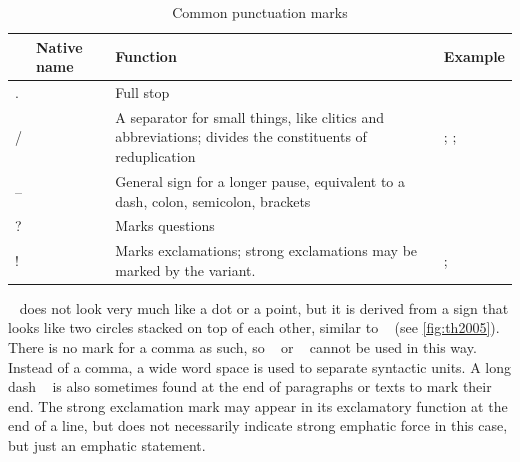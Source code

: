 \begin{table}[tp]
\caption{Common punctuation marks}
\begin{tabu} to 
\toprule
\tableheaderfont

	& Native name
	& Function
	& Example
	\\
	
\toprule

.
	& 
	& Full stop
	& 
	\\
	
\midrule

/
	& 
	& A separator for small things, like clitics and abbreviations; 
		divides the constituents of reduplication
	& ; %
		; %
	\\
	
\midrule

–
	& 
	& General sign for a longer pause, equivalent to a dash, 
		colon, semicolon, brackets 
	& 
	\\

\midrule

?
	& 
	& Marks questions
	& 
	\\

\midrule

!
	& 
	& Marks exclamations; strong exclamations may be marked by the  
		variant.
	& ; %
	\\

\bottomrule
\end{tabu}
\label{tab:thpunctcom}
\end{table}

~ does not look very much like a dot or a point, but it is 
derived from a sign that looks like two circles stacked on top of each other, 
similar to \ayr{/}~\orth{-} (see \autoref{fig:th2005}). There is no mark for a 
comma as such, so \ayr{/}~\orth{-} or ~\orth{--} cannot be 
used in this way. Instead of a comma, a wide word space is used to separate 
syntactic units. A long dash ~\orth{---} is also sometimes found at the 
end of paragraphs or texts to mark their end. The strong 
exclamation mark  may appear in its exclamatory function at the end 
of a line, but does not necessarily indicate strong emphatic force in this 
case, but just an emphatic statement.

